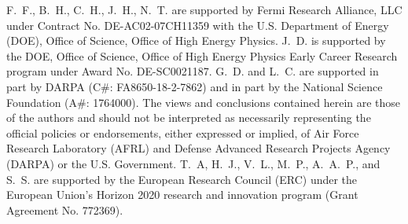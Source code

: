 \documentclass[tinyml]{acmart}
\newcommand{\noind}[0]{\vspace{5 pt} \noindent}
\newcommand{\noindpar}[1]{\noind {\bf #1}}
\begin{document}



\begin{acks}
F.~F., B.~H., C.~H., J.~H., N.~T. are supported by Fermi Research Alliance, LLC under Contract No. DE-AC02-07CH11359 with the U.S. Department of Energy (DOE), Office of Science, Office of High Energy Physics.
J.~D. is supported by the DOE, Office of Science, Office of High Energy Physics Early Career Research program under Award No. DE-SC0021187.
G.~D. and L.~C. are supported in part by DARPA (C\#: FA8650-18-2-7862) and in part by the National Science Foundation (A\#: 1764000).
The views and conclusions contained herein are those of the authors and should not be interpreted as necessarily representing the official policies or endorsements, either expressed or implied, of Air Force Research Laboratory (AFRL) and Defense Advanced Research Projects Agency (DARPA) or the U.S. Government.
T.~A, H.~J., V.~L., M.~P., A.~A.~P., and S.~S.  are supported by the European Research Council (ERC) under the European Union's Horizon 2020 research and innovation program (Grant Agreement No. 772369).
\end{acks}



\end{document}
